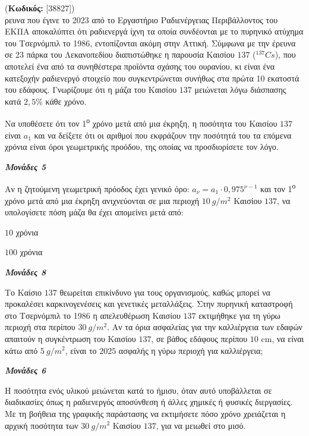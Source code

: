 \documentclass[11pt,a4paper,twoside]{book}
\newcounter{askhsh}[chapter]
\renewcommand{\theaskhsh}{
	\bf{\titlefont{\Large{\thechapter}}.\arabic{askhsh}}
}
\newcommand{\Askhsh}[2]{\refstepcounter{askhsh}{\titlefont{Άσκηση\theaskhsh} - \textcolor{maincolor}{ΘΕΜΑ #2}} (\small{\textbf{Κωδικός:} #1})\\}{}
\newcommand{\monades}[1]{
\hspace*{\fill}
\textbf{\textit{\textcolor{maincolor}{Μονάδες #1}}}}
\begin{document}
\Askhsh{[38827]}
Έρευνα που έγινε το 2023 από το Εργαστήριο Ραδιενέργειας Περιβάλλοντος του ΕΚΠΑ αποκαλύπτει ότι ραδιενεργά ίχνη τα οποία συνδέονται με το πυρηνικό ατύχημα του Τσερνόμπιλ το 1986, εντοπίζονται ακόμη στην Αττική. Σύμφωνα με την έρευνα σε 23 πάρκα του Λεκανοπεδίου διαπιστώθηκε η παρουσία Καισίου $137$ ($^{137}Cs$), που αποτελεί ένα από τα συνηθέστερα προϊόντα σχάσης του ουρανίου, κι είναι ένα κατεξοχήν ραδιενεργό στοιχείο που συγκεντρώνεται συνήθως στα πρώτα 10 εκατοστά του εδάφους. Γνωρίζουμε ότι η μάζα του Καισίου $137$ μειώνεται λόγω διάσπασης κατά $2{,}5\%$ κάθε χρόνο.

\begin{alist}
\item Να υποθέσετε ότι τον 1\textsuperscript{ο} χρόνο μετά από μια έκρηξη, η ποσότητα του Καισίου $137$ είναι $a_1$ και να δείξετε ότι οι αριθμοί που εκφράζουν την ποσότητά του τα επόμενα χρόνια είναι όροι γεωμετρικής προόδου, της οποίας να προσδιορίσετε τον λόγο.
\monades{5}
\item Αν η ζητούμενη γεωμετρική πρόοδος έχει γενικό όρο: $a_{\nu} = a_1 \cdot 0{,}975^{\nu - 1}$ και τον 1\textsuperscript{ο} χρόνο μετά από μια έκρηξη ανιχνεύονται σε μια περιοχή $10\ g/m^{2}$ Καισίου $137$, να υπολογίσετε πόση μάζα θα έχει απομείνει μετά από:

\begin{rlist}
\item $10$ χρόνια

\item $100$ χρόνια
\monades{8}
\end{rlist}
\item

\begin{rlist}
\item Το Καίσιο $137$ θεωρείται επικίνδυνο για τους οργανισμούς, καθώς μπορεί να προκαλέσει καρκινογενέσεις και γενετικές μεταλλάξεις. Στην πυρηνική καταστροφή στο Τσερνόμπιλ το 1986 η απελευθέρωση Καισίου $137$ εκτιμήθηκε για τη γύρω περιοχή στα περίπου $30\ g/m^{2}$. Αν τα όρια ασφαλείας για την καλλιέργεια των εδαφών απαιτούν η συγκέντρωση του Καισίου $137$, σε βάθος εδάφους περίπου $10$ cm, να είναι κάτω από $5\ g/m^{2}$, είναι το $2025$ ασφαλής η γύρω περιοχή για καλλιέργεια;
\monades{6}
\item Η ποσότητα ενός υλικού μειώνεται κατά το ήμισυ, όταν αυτό υποβάλλεται σε διαδικασίες όπως η ραδιενεργός αποσύνθεση ή άλλες χημικές ή φυσικές διεργασίες. Με τη βοήθεια της γραφικής παράστασης να εκτιμήσετε πόσο χρόνο χρειάζεται η αρχική ποσότητα των $30\ g/m^{2}$ Καισίου $137$, για να μειωθεί στο μισό.


\end{rlist}
\end{alist}
\end{document}
